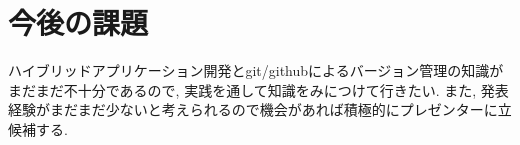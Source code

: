 \section{今後の課題}
ハイブリッドアプリケーション開発とgit/githubによるバージョン管理の知識が
まだまだ不十分であるので, 実践を通して知識をみにつけて行きたい.
また, 発表経験がまだまだ少ないと考えられるので機会があれば積極的にプレゼンターに立候補する.
